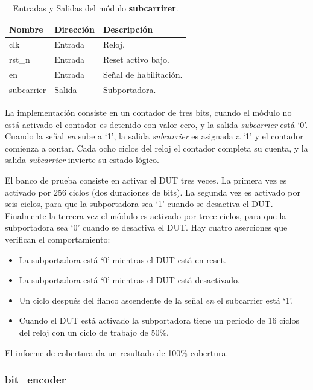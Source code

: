 \documentclass[a4paper, twoside, 11pt]{report}
\begin{document}
\begin{table}[htb]
  \centering
  \tablezebra
  \begin{tabulary}{\linewidth}{l|l|L}
    \textbf{Nombre}&\textbf{Dirección}&\textbf{Descripción} \\
    \hline
    clk&Entrada&Reloj. \\
    rst\_n&Entrada&Reset activo bajo. \\
    en&Entrada&Señal de habilitación. \\
    subcarrier&Salida&Subportadora. \\
  \end{tabulary}
  \caption{Entradas y Salidas del módulo \textbf{subcarrirer}.}
  \label{tab:ports_subcarrier}
\end{table}

La implementación consiste en un contador de tres bits, cuando el módulo no está activado el contador es detenido con valor cero, y la salida \textit{subcarrier} está ‘0’. Cuando la señal \textit{en} sube a ‘1’, la salida \textit{subcarrier} es asignada a ‘1’ y el contador comienza a contar. Cada ocho ciclos del reloj el contador completa su cuenta, y la salida \textit{subcarrier} invierte su estado lógico.

El banco de prueba consiste en activar el DUT tres veces. La primera vez es activado por 256 ciclos (dos duraciones de bits). La segunda vez es activado por seis ciclos, para que la subportadora sea ‘1’ cuando se desactiva el DUT. Finalmente la tercera vez el módulo es activado por trece ciclos, para que la subportadora sea ‘0’ cuando se desactiva el DUT. Hay cuatro aserciones que verifican el comportamiento:

\begin{itemize}
  \item La subportadora está ‘0’ mientras el DUT está en reset.
  \item La subportadora está ‘0’ mientras el DUT está desactivado.
  \item Un ciclo después del flanco ascendente de la señal \textit{en} el subcarrier está ‘1’.
  \item Cuando el DUT está activado la subportadora tiene un periodo de 16 ciclos del reloj con un ciclo de trabajo de 50\%.
\end{itemize}

El informe de cobertura da un resultado de 100\% cobertura.

\FloatBarrier
\subsubsection{bit\_encoder}
\end{document}
